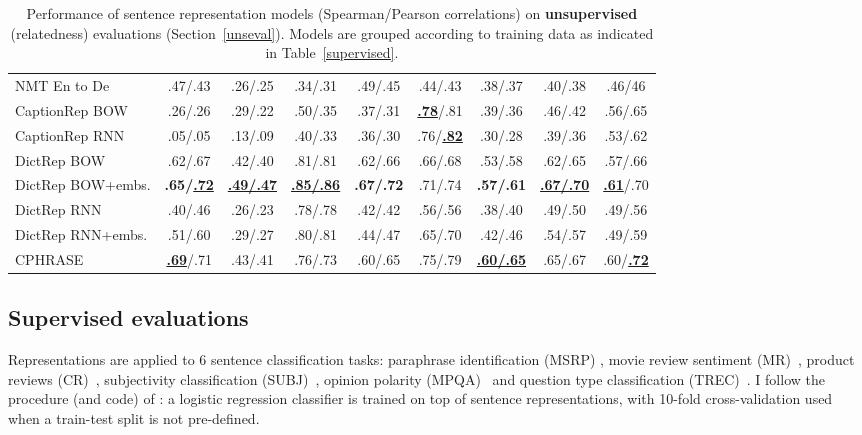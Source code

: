 \begin{table*}[ht]
\begin{adjustwidth}{-1cm}{}
\begin{center}
{\begin{tabular}{l|cccccc|c|c}
          NMT En to De & .47/.43 & .26/.25 & .34/.31 & .49/.45 & .44/.43 & .38/.37 & .40/.38  &.46/46 \\
          CaptionRep BOW & .26/.26 & .29/.22	& .50/.35	& .37/.31 &  \underline{ \bf .78}/.81 & .39/.36 & .46/.42 & .56/.65 \\
          CaptionRep RNN & .05/.05	& .13/.09	& .40/.33	& .36/.30	& .76/\underline{\bf .82}	& .30/.28 & .39/.36 & .53/.62\\
                    DictRep BOW & .62/.67 	&.42/.40	&.81/.81	&.62/.66	&.66/.68	&.53/.58	&.62/.65 & .57/.66\\
          DictRep BOW+embs. & \bf .65/\underline{.72}	& \bf \underline{.49/.47}	& \bf  \underline{.85/.86}	& \bf  .67/.72	&.71/.74	& \bf .57/.61	&  \bf \underline{.67/.70}  & \underline{ {\bf .61}}/.70 \\
DictRep RNN & .40/.46	&.26/.23	&.78/.78	&.42/.42	&.56/.56	&.38/.40	&.49/.50 & .49/.56 \\
DictRep RNN+embs. & .51/.60	&.29/.27	&.80/.81	&.44/.47	&.65/.70	&.42/.46	&.54/.57 & .49/.59 \\
          \hline   
          CPHRASE & \underline{\bf .69}/.71 & .43/.41 & .76/.73  & .60/.65 & .75/.79 &  \bf \underline{.60/.65} &  .65/.67 & .60/\underline{\bf .72} \\
           
          \hline 
        \end{tabular}

    }
      \end{center}
      \end{adjustwidth}
    \caption{\label{unsupervised} Performance of sentence representation models (Spearman/Pearson correlations) on {\bf unsupervised} (relatedness) evaluations (Section~\ref{unseval}). Models are grouped according to training data as indicated in Table~\ref{supervised}.}
  \vspace*{-4ex} 
\end{table*}





\subsection{Supervised evaluations}
\label{supersec}
Representations are applied to 6 sentence classification tasks: paraphrase identification (MSRP) \citep{dolan2004unsupervised}, movie review sentiment (MR)~\citep{pang2005seeing}, product reviews (CR)~\citep{hu2004mining}, subjectivity classification (SUBJ)~\citep{pang2004sentimental}, opinion polarity (MPQA)~\citep{wiebe2005annotating} and question type classification (TREC)~\citep{voorhees2002overview}. I follow the procedure (and code) of \cite{kiros2015skip}: a logistic regression classifier is trained on top of sentence representations, with 10-fold cross-validation used when a train-test split is not pre-defined. 

